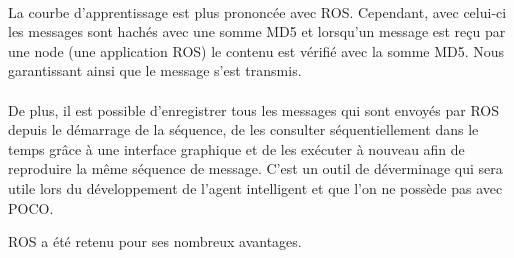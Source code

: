 \paragraph{}La courbe d’apprentissage est plus prononcée avec ROS. Cependant, avec celui-ci les messages sont hachés avec une somme MD5 et lorsqu’un message est reçu par une node (une application ROS) le contenu est vérifié avec la somme MD5. Nous garantissant ainsi que le message s’est transmis.

\paragraph{}De plus, il est possible d’enregistrer tous les messages qui sont envoyés par ROS depuis le démarrage de la séquence, de les consulter séquentiellement dans le temps grâce à une interface graphique et de les exécuter à nouveau afin de reproduire la même séquence de message. C’est un outil de déverminage qui sera utile lors du développement de l’agent intelligent et que l’on ne possède pas avec POCO.

ROS a été retenu pour ses nombreux avantages. 

